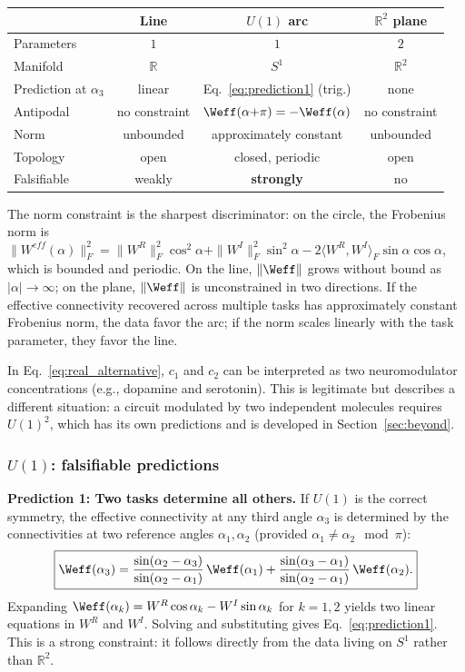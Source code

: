 \documentclass[11pt]{article}
\begin{document}
\begin{center}
\renewcommand{\arraystretch}{1.3}
\begin{tabular}{@{}lccc@{}}
\toprule
& \textbf{Line} & \textbf{$U(1)$ arc} & \textbf{$\mathbb{R}^2$ plane} \\
\midrule
Parameters & $1$ & $1$ & $2$ \\
Manifold & $\mathbb{R}$ & $S^1$ & $\mathbb{R}^2$ \\
Prediction at $\alpha_3$ & 
linear & Eq.~\eqref{eq:prediction1} (trig.) & none \\
Antipodal & no constraint & 
$\Weff(\alpha{+}\pi) = -\Weff(\alpha)$ & no constraint \\
Norm & unbounded & approximately constant & unbounded \\
Topology & open & closed, periodic & open \\
Falsifiable & weakly & \textbf{strongly} & no \\
\bottomrule
\end{tabular}
\end{center}

The norm constraint is the sharpest discriminator: on the circle, 
the Frobenius norm is $\|W^{eff}(\alpha)\|_F^2 = \|W^R\|_F^2\cos^2\alpha 
+ \|W^I\|_F^2\sin^2\alpha - 2\langle W^R, W^I\rangle_F 
\sin\alpha\cos\alpha$, which is bounded and periodic. On the line, 
$\|\Weff\|$ grows without bound as $|\alpha| \to \infty$; on the 
plane, $\|\Weff\|$ is unconstrained in two directions. If the 
effective connectivity recovered across multiple tasks has 
approximately constant Frobenius norm, the data favor the arc; if 
the norm scales linearly with the task parameter, they favor the 
line.

In Eq.~\eqref{eq:real_alternative}, $c_1$ and $c_2$ can be 
interpreted as two neuromodulator concentrations (e.g., dopamine and serotonin). This is legitimate but describes a different situation: a circuit modulated by two independent molecules requires $U(1)^2$, which has its own predictions and is developed in Section~\ref{sec:beyond}.

\subsubsection{$U(1)$: falsifiable predictions}
\label{sec:predictions}

\textbf{Prediction 1: Two tasks determine all others.}
If $U(1)$ is the correct symmetry, the effective connectivity at any third angle $\alpha_3$ is determined by the connectivities at two reference angles $\alpha_1, \alpha_2$ (provided $\alpha_1 \neq \alpha_2 \mod \pi$):
\begin{equation}
\boxed{\Weff(\alpha_3) = \frac{\sin(\alpha_2 - \alpha_3)}{\sin(\alpha_2 - \alpha_1)}\,\Weff(\alpha_1) + \frac{\sin(\alpha_3 - \alpha_1)}{\sin(\alpha_2 - \alpha_1)}\,\Weff(\alpha_2).}
\label{eq:prediction1}
\end{equation}
Expanding $\Weff(\alpha_k) = W^R\cos\alpha_k - W^I\sin\alpha_k$ for $k=1,2$ yields two linear equations in $W^R$ and $W^I$. Solving and substituting gives Eq.~\eqref{eq:prediction1}. This is a strong constraint: it follows directly from the data living on $S^1$ rather than $\mathbb{R}^2$.
\end{document}
